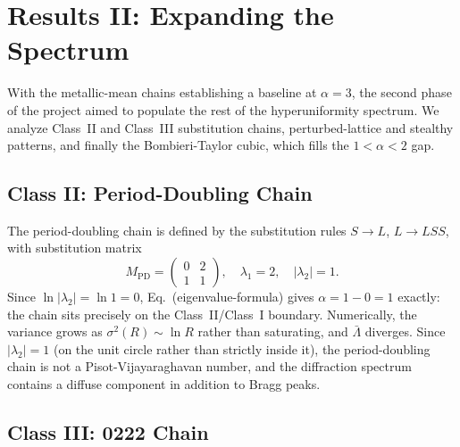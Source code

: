 \documentclass[11pt]{article}
\begin{document}
\section{Results II: Expanding the Spectrum}
\label{sec:results-spectrum}

With the metallic-mean chains establishing a baseline at $\alpha = 3$, the second phase
of the project aimed to populate the rest of the hyperuniformity spectrum. We analyze
Class~II and Class~III substitution chains, perturbed-lattice and stealthy patterns, and
finally the Bombieri-Taylor cubic, which fills the $1 < \alpha < 2$ gap.

\subsection{Class II: Period-Doubling Chain}
\label{sec:period-doubling}

The period-doubling chain is defined by the substitution rules $S \to L$, $L \to LSS$,
with substitution matrix
\begin{equation}
  M_\text{PD} = \begin{pmatrix} 0 & 2 \\ 1 & 1 \end{pmatrix},
  \quad \lambda_1 = 2, \quad |\lambda_2| = 1.
  \label{eq:pd-matrix}
\end{equation}
Since $\ln|\lambda_2| = \ln 1 = 0$, Eq.~(eigenvalue-formula) gives
$\alpha = 1 - 0 = 1$ exactly: the chain sits precisely on the Class~II/Class~I boundary.
Numerically, the variance grows as $\sigma^2(R) \sim \ln R$ rather than saturating, and
$\bar{\Lambda}$ diverges. Since $|\lambda_2| = 1$ (on the unit circle rather than strictly
inside it), the period-doubling chain is not a Pisot-Vijayaraghavan number, and the diffraction
spectrum contains a diffuse component in addition to Bragg peaks.

\subsection{Class III: 0222 Chain}
\label{sec:0222}
\end{document}
